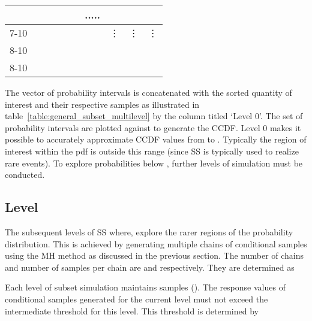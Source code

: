 \documentclass[journal]{IEEEtran}
\begin{document}
\begin{table*}[!t]
{\begin{tabular}{cccccccccc}
                             &                          &                         &                       &                       & \multicolumn{1}{c|}{} & \multicolumn{1}{c|}{.....} & \multicolumn{1}{c|}{} & \multicolumn{1}{c|}{} & \multicolumn{1}{c|}{} \\ \cline{7-10} 
                             &                          &                         &                       &                       &                       & \multicolumn{1}{c|}{} & \multicolumn{1}{c|}{\vdots} & \multicolumn{1}{c|}{\vdots} & \multicolumn{1}{c|}{\vdots} \\ \cline{8-10}
                             &                          &                         &                       &                       &                       & \multicolumn{1}{c|}{} & \multicolumn{1}{c|}{} & \multicolumn{1}{c|}{} & \multicolumn{1}{c|}{} \\ \cline{8-10} 
														
\end{tabular}
}
\caption{}
\label{table:general_subset_multilevel}
\end{table*}

\noindent The vector of probability intervals  is concatenated with the sorted quantity of interest  and their respective samples  as illustrated in table~\ref{table:general_subset_multilevel} by the column titled `Level 0'. 
The set of probability intervals  are plotted against  to generate the CCDF. Level 0 makes it possible to accurately approximate CCDF values from  to . Typically the region of interest within the pdf is outside this range (since SS is typically used to realize rare events). To explore probabilities below , further levels of simulation must be conducted.

\subsection{Level }

The subsequent levels of SS where,  explore the rarer regions of the probability distribution. This is achieved by generating multiple chains of conditional samples using the MH method as discussed in the previous section. The number of chains and number of samples per chain are  and  respectively. They are determined as





\noindent Each level of subset simulation maintains  samples (). The response values of conditional samples generated for the current level  must not exceed the intermediate threshold  for this level. This threshold is determined by
\end{document}
